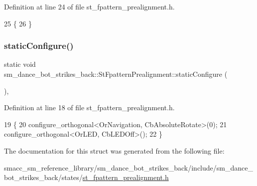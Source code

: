 Definition at line 24 of file st\+\_\+fpattern\+\_\+prealignment.\+h.


\begin{DoxyCode}
25   \{ 
26   \}
\end{DoxyCode}
\mbox{\label{structsm__dance__bot__strikes__back_1_1StFpatternPrealignment_a174f61be56796e4124aad1f97a49cb26}} 
\subsubsection{\texorpdfstring{static\+Configure()}{staticConfigure()}}
{\footnotesize\ttfamily static void sm\+\_\+dance\+\_\+bot\+\_\+strikes\+\_\+back\+::\+St\+Fpattern\+Prealignment\+::static\+Configure (\begin{DoxyParamCaption}{ }\end{DoxyParamCaption})\hspace{0.3cm}{\ttfamily [inline]}, {\ttfamily [static]}}



Definition at line 18 of file st\+\_\+fpattern\+\_\+prealignment.\+h.


\begin{DoxyCode}
19   \{
20     configure\_orthogonal<OrNavigation, CbAbsoluteRotate>(0);
21     configure\_orthogonal<OrLED, CbLEDOff>();
22   \}
\end{DoxyCode}


The documentation for this struct was generated from the following file\+:\begin{DoxyCompactItemize}
\item 
smacc\+\_\+sm\+\_\+reference\+\_\+library/sm\+\_\+dance\+\_\+bot\+\_\+strikes\+\_\+back/include/sm\+\_\+dance\+\_\+bot\+\_\+strikes\+\_\+back/states/\hyperlink{st__fpattern__prealignment_8h}{st\+\_\+fpattern\+\_\+prealignment.\+h}\end{DoxyCompactItemize}
